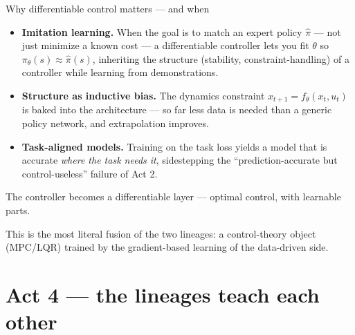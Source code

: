 \documentclass[10pt, aspectratio=169]{beamer}
\begin{document}
\begin{frame}{Why differentiable control matters --- and when}
\begin{itemize}\setlength\itemsep{2pt}
\item \textbf{Imitation learning.} When the goal is to match an expert policy $\hat\pi$ --- not just minimize a known cost --- a differentiable controller lets you fit $\theta$ so $\pi_\theta(s)\approx\hat\pi(s)$, inheriting the structure (stability, constraint-handling) of a controller while learning from demonstrations.
\item \textbf{Structure as inductive bias.} The dynamics constraint $x_{t+1}=f_\theta(x_t,u_t)$ is baked into the architecture --- so far less data is needed than a generic policy network, and extrapolation improves.
\item \textbf{Task-aligned models.} Training on the task loss yields a model that is accurate \emph{where the task needs it}, sidestepping the ``prediction-accurate but control-useless'' failure of Act 2.
\end{itemize}
\medskip

\pause
\begin{center}\large
The controller becomes a \alert{differentiable layer} --- optimal control, with learnable parts.
\end{center}
\medskip
\pause
{\footnotesize\textcolor{mLightBrown}{This is the most literal fusion of the two lineages: a control-theory object (MPC/LQR) trained by the gradient-based learning of the data-driven side.}}
\end{frame}

\section{Act 4 --- the lineages teach each other}
\end{document}
